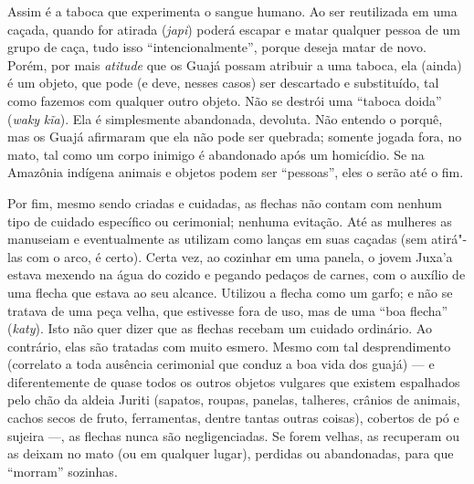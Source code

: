Assim é a taboca que experimenta o sangue humano. Ao ser reutilizada em
uma caçada, quando for atirada (\emph{japi}) poderá escapar e matar
qualquer pessoa de um grupo de caça, tudo isso ``intencionalmente'',
porque deseja matar de novo. Porém, por mais \emph{atitude} que os Guajá
possam atribuir a uma taboca, ela (ainda) é um objeto, que pode (e deve,
nesses casos) ser descartado e substituído, tal como fazemos com
qualquer outro objeto. Não se destrói uma ``taboca doida'' (\emph{waky}
\emph{kĩa}). Ela é simplesmente abandonada, devoluta. Não entendo o
porquê, mas os Guajá afirmaram que ela não pode ser quebrada; somente
jogada fora, no mato, tal como um corpo inimigo é abandonado após um
homicídio. Se na Amazônia indígena animais e objetos podem ser
``pessoas'', eles o serão até o fim.

Por fim, mesmo sendo criadas e cuidadas, as flechas não contam com
nenhum tipo de cuidado específico ou cerimonial; nenhuma evitação. Até
as mulheres as manuseiam e eventualmente as utilizam como lanças em suas
caçadas (sem atirá"-las com o arco, é certo). Certa vez, ao cozinhar em
uma panela, o jovem Juxa'a estava mexendo na água do cozido e pegando
pedaços de carnes, com o auxílio de uma flecha que estava ao seu
alcance. Utilizou a flecha como um garfo; e não se tratava de uma peça
velha, que estivesse fora de uso, mas de uma ``boa flecha'' (\emph{katy}).
Isto não quer dizer que as flechas recebam um cuidado ordinário. Ao
contrário, elas são tratadas com muito esmero. Mesmo com tal
desprendimento (correlato a toda ausência cerimonial que conduz a boa
vida dos guajá) --- e diferentemente de quase todos os outros objetos
vulgares que existem espalhados pelo chão da aldeia Juriti (sapatos,
roupas, panelas, talheres, crânios de animais, cachos secos de fruto,
ferramentas, dentre tantas outras coisas), cobertos de pó e sujeira ---,
as flechas nunca são negligenciadas. Se forem velhas, as recuperam ou as
deixam no mato (ou em qualquer lugar), perdidas ou abandonadas, para que
``morram'' sozinhas.
